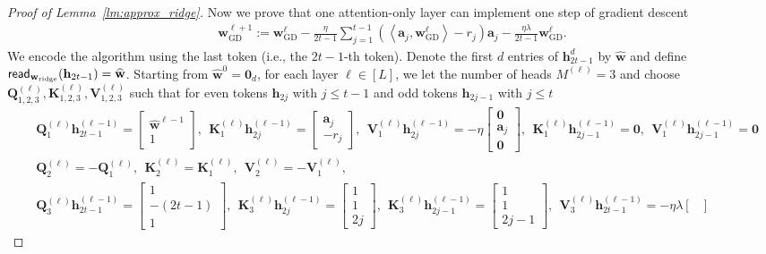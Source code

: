 \documentclass[10pt]{article}
\renewcommand{\hat}{\widehat}
\newcommand{\<}{\left\langle}
\renewcommand{\>}{\right\rangle}
\renewcommand{\bQ}{\mathbf{Q}}
\newcommand{\bzero}{{\mathbf 0}}
\renewcommand{\read}{{\sf read}}
\newcommand{\ridge}{{\rm ridge}}
\newcommand{\GD}{{\mathrm{GD}}}
\newcommand{\partd}{{d}}
\newcommand{\ssl}{{{\ell}}}
\def\bK{{\mathbf K}}
\def\bQ{{\mathbf Q}}
\def\bV{{\mathbf V}}
\def\ba{{\mathbf a}}
\def\bh{{\mathbf h}}
\def\bw{{\mathbf w}}
\begin{document}
\begin{proof}[Proof of Lemma~\ref{lm:approx_ridge}]
Now we prove that one  attention-only layer can implement one step of gradient descent
\begin{align*}
    \bw^{\ssl+1}_{\GD}:=\bw^{\ssl}_{\GD}- \frac{\eta}{2t-1}\sum_{j=1}^{t-1}(\<\ba_j,\bw^\ssl_{\GD}\>-r_j)\ba_j- \frac{\eta\lambda}{2t-1}\bw^\ssl_{\GD}.
\end{align*}
We encode the algorithm using the last token (i.e., the $2t-1$-th token). 
Denote the first $d$ entries of $\bh_{2t-1}^{\partd}$ by $\hat\bw$ and  define $\read_{\bw_{\ridge}}(\bh_{2t-1})=\hat\bw$. Starting from $\hat\bw^{0}=\bzero_d$, for each layer $\ell\in[L]$, we let the number of heads $M^{(\ell)}=3$ and  choose $\bQ_{1,2,3}^{(\ell)},\bK_{1,2,3}^{(\ell)},\bV_{1,2,3}^{(\ell)}$ such that for even tokens $\bh_{2j}$ with $j\leq t-1$ and odd tokens $\bh_{2j-1}$ with $j\leq t$
\begin{align*}
    &\bQ_1^{(\ell)}\bh^{(\ell-1)}_{2t-1}=\begin{bmatrix}
        \hat\bw^{\ell-1}\\ 1
    \end{bmatrix},~~ \bK_1^{(\ell)}\bh^{(\ell-1)}_{2j}=\begin{bmatrix}
        \ba_j\\ -r_j 
    \end{bmatrix},~~ \bV_1^{(\ell)}\bh^{(\ell-1)}_{2j}=-\eta\begin{bmatrix}
        \bzero\\ \ba_j \\ \bzero
    \end{bmatrix},~~
    \bK_1^{(\ell)}\bh^{(\ell-1)}_{2j-1}=\bzero, ~~\bV_1^{(\ell)}\bh^{(\ell-1)}_{2j-1}=\bzero
    \\
    &
    \bQ_2^{(\ell)}=-\bQ_1^{(\ell)},~~ \bK_2^{(\ell)}=\bK_1^{(\ell)},~~  \bV_2^{(\ell)}=-\bV_1^{(\ell)},\\
     &
     \bQ_3^{(\ell)}\bh^{(\ell-1)}_{2t-1}=\begin{bmatrix}
         1\\-(2t-1)\\ 1
    \end{bmatrix},~~ \bK_3^{(\ell)}\bh^{(\ell-1)}_{2j}=\begin{bmatrix}
        1\\ 1 \\2j
    \end{bmatrix},~~ \bK_3^{(\ell)}\bh^{(\ell-1)}_{2j-1}=\begin{bmatrix}
        1\\ 1 \\2j-1
    \end{bmatrix},~~ \bV_3^{(\ell)}\bh^{(\ell-1)}_{2t-1}=-\eta\lambda\begin{bmatrix}

\end{bmatrix}
\end{align*}
\end{proof}
\end{document}
